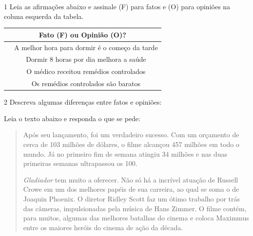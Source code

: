 {

\num{1} Leia as afirmações abaixo e assinale (F) para fatos e (O) para
  opiniões na coluna esquerda da tabela. 

\begin{table}[]
\begin{tabular}{|cc|}
\hline
\multicolumn{2}{|c|}{\cellcolor[HTML]{DAE8FC}\textbf{Fato (F) ou Opinião (O)?}} \\ \hline
\multicolumn{1}{|c|}{}      & A melhor hora para dormir é o começo da tarde     \\ \hline
\multicolumn{1}{|c|}{}      & Dormir 8 horas por dia melhora a saúde            \\ \hline
\multicolumn{1}{|c|}{}      & O médico receitou remédios controlados            \\ \hline
\multicolumn{1}{|c|}{}      & Os remédios controlados são baratos               \\ \hline
\end{tabular}
\end{table}


\num{2} Descreva algumas diferenças entre fatos e opiniões:


Leia o texto abaixo e responda o que se pede:

\begin{quote}

Após seu lançamento, foi um verdadeiro sucesso. Com um orçamento de
cerca de 103 milhões de dólares, o filme alcançou 457 milhões em todo o
mundo. Já no primeiro fim de semana atingiu 34 milhões e nas duas
primeiras semanas ultrapassou os 100.

\textit{Gladiador} tem muito a oferecer. Não só há a incrível atuação de Russell
Crowe em um dos melhores papéis de sua carreira, ao qual se soma o de
Joaquin Phoenix. O diretor Ridley Scott faz um ótimo trabalho por trás
das câmeras, impulsionadas pela música de Hans Zimmer. O filme contém,
para muitos, algumas das melhores batalhas do cinema e coloca Maximmus
entre os maiores heróis do cinema de ação da década.


\end{quote}}
